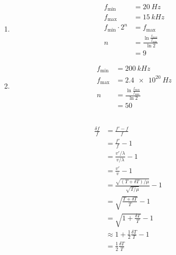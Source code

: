\documentclass{article}
\begin{document}
\begin{enumerate}
  \item

        \begin{align*}
          f_\text{min}           & = \qty{20}{Hz}                                        \\
          f_\text{max}           & = \qty{15}{kHz}                                       \\
          f_\text{min} \cdot 2^n & = f_\text{max}                                        \\
          n                      & = \frac{\ln \frac{f_\text{max}}{f_\text{min}}}{\ln 2} \\
                                 & = 9
        \end{align*}

  \item

        \begin{align*}
          f_\text{min} & = \qty{200}{kHz}                                      \\
          f_\text{max} & = \qty{2.4e20}{Hz}                                    \\
          n            & = \frac{\ln \frac{f_\text{max}}{f_\text{min}}}{\ln 2} \\
                       & = 50
        \end{align*}
\end{enumerate}

\subsection{}

\begin{align*}
  \frac{\delta f}{f} & = \frac{f' - f}{f}                                       \\
                     & = \frac{f'}{f} - 1                                       \\
                     & = \frac{v' / \lambda}{v / \lambda} - 1                   \\
                     & = \frac{v'}{v} - 1                                       \\
                     & = \frac{\sqrt{(T + \delta T) / \mu}}{\sqrt{T / \mu}} - 1 \\
                     & = \sqrt{\frac{T + \delta T}{T}} - 1                      \\
                     & = \sqrt{1 + \frac{\delta T}{T}} - 1                      \\
                     & \approx 1 + \frac{1}{2} \frac{\delta T}{T} - 1           \\
                     & = \frac{1}{2} \frac{\delta T}{T}
\end{align*}
\end{document}
